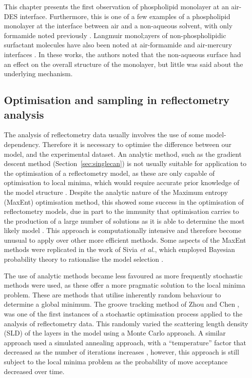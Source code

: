 This chapter presents the first observation of phospholipid monolayer at an air-DES interface.
Furthermore, this is one of a few examples of a phospholipid monolayer at the interface between air and a non-aqueous solvent, with only formamide noted previously \cite{graner_phospholipidic_1995}.
Langmuir monol;ayers of non-phospholipidic surfactant molecules have also been noted at air-formamide and air-mercury interfaces \cite{weinbach_self-assembled_1993,magnussen_self-assembly_1996,kraack_structure_2002}.
In these works, the authors noted that the non-aqueous surface had an effect on the overall structure of the monolayer, but little was said about the underlying mechanism.

\subsection{Optimisation and sampling in reflectometry analysis}
The analysis of reflectometry data usually involves the use of some model-dependency.
Therefore it is necessary to optimise the difference between our model, and the experimental dataset.
An analytic method, such as the gradient descent method (Section~\ref{sec:singlecan}) is not usually suitable for application to the optimisation of a reflectometry model, as these are only capable of optimisation to local minima, which would require accurate prior knowledge of the model structure \cite{lovell_analysis_1999}.
Despite the analytic nature of the Maximum entropy (MaxEnt) optimisation method, this showed some success in the optimisation of reflectometry models, due in part to the immunity that optimisation carries to the production of a large number of solutions as it is able to determine the most likely model \cite{geoghegan_experimental_1996,bucknall_neutron_1997}.
This approach is computationally intensive and therefore become unusual to apply over other more efficient methods.
Some aspects of the MaxEnt methods were replicated in the work of Sivia \emph{et al.}, which employed Bayesian probability theory to rationalise the model selection \cite{geoghegan_experimental_1996,sivia_introduction_1993,sivia_bayesian_1998,sivia_analysis_1991}.

The use of analytic methods became less favoured as more frequently stochastic methods were used, as these offer a more pragmatic solution to the local minima problem.
These are methods that utilise inherently random behaviour to determine a global minimum.
The groove tracking method of Zhou and Chen \cite{zhou_model-independent_1993,zhou_theoretical_1995}, was one of the first instances of a stochastic optimisation process applied to the analysis of reflectometry data.
This randomly varied the scattering length density (SLD) of the layers in the model using a Monte Carlo approach.
A similar approach used a simulated annealing approach, with a ``temperature'' factor that decreased as the number of iterations increases \cite{kunz_model-free_1993}, however, this approach is still subject to the local minima problem as the probability of move acceptance decreased over time.

